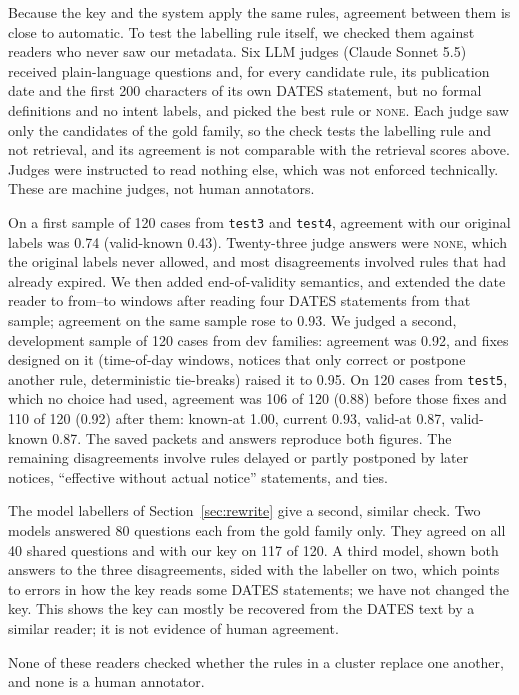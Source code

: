 \documentclass[11pt]{article}
\begin{document}
Because the key and the system apply the same rules, agreement between them is close to automatic. To test the labelling rule itself, we checked them against readers who never saw our metadata. Six LLM judges (Claude Sonnet 5.5) received plain-language questions and, for every candidate rule, its publication date and the first 200 characters of its own DATES statement, but no formal definitions and no intent labels, and picked the best rule or \textsc{none}. Each judge saw only the candidates of the gold family, so the check tests the labelling rule and not retrieval, and its agreement is not comparable with the retrieval scores above. Judges were instructed to read nothing else, which was not enforced technically. These are machine judges, not human annotators.

On a first sample of 120 cases from \texttt{test3} and \texttt{test4}, agreement with our original labels was 0.74 (valid-known 0.43). Twenty-three judge answers were \textsc{none}, which the original labels never allowed, and most disagreements involved rules that had already expired. We then added end-of-validity semantics, and extended the date reader to from--to windows after reading four DATES statements from that sample; agreement on the same sample rose to 0.93. We judged a second, development sample of 120 cases from dev families: agreement was 0.92, and fixes designed on it (time-of-day windows, notices that only correct or postpone another rule, deterministic tie-breaks) raised it to 0.95. On 120 cases from \texttt{test5}, which no choice had used, agreement was 106 of 120 (0.88) before those fixes and 110 of 120 (0.92) after them: known-at 1.00, current 0.93, valid-at 0.87, valid-known 0.87. The saved packets and answers reproduce both figures. The remaining disagreements involve rules delayed or partly postponed by later notices, ``effective without actual notice'' statements, and ties.

The model labellers of Section~\ref{sec:rewrite} give a second, similar check. Two models answered 80 questions each from the gold family only. They agreed on all 40 shared questions and with our key on 117 of 120. A third model, shown both answers to the three disagreements, sided with the labeller on two, which points to errors in how the key reads some DATES statements; we have not changed the key. This shows the key can mostly be recovered from the DATES text by a similar reader; it is not evidence of human agreement.

None of these readers checked whether the rules in a cluster replace one another, and none is a human annotator.
\end{document}
